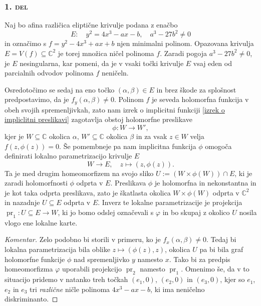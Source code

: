 \documentclass[mat1]{fmfdelo}
\numberwithin{equation}{section}
\newcommand{\C}{\mathbb C}
\DeclareMathOperator{\pr}{pr}
\theoremstyle{definition}
\newenvironment{komentar}[1][Komentar]{\begin{proof}[#1]\let\qed\relax}{\end{proof}}
\begin{document}
\subsubsection*{\textsc{1. del}}
Naj bo afina različica eliptične krivulje podana z enačbo
\[
    E: \quad y^2 = 4x^3 - ax - b, \quad a^3 - 27b^2 \neq 0
\]
in označimo s $f = y^2 - 4x^3 + ax + b$ njen minimalni polinom. Opazovana krivulja $E = V(f) \subseteq \C^2$ je torej množica ničel polinoma $f$. Zaradi pogoja $a^3 - 27b^2 \neq 0$, je $E$ nesingularna, kar pomeni, da je v vsaki točki krivulje $E$ vsaj eden od parcialnih odvodov polinoma $f$ neničeln. 

Osredotočimo se sedaj na eno točko $(\alpha, \beta) \in E$ in brez škode za splošnost predpostavimo, da je $f_y(\alpha, \beta) \neq 0$. Polinom $f$ je seveda holomorfna funkcija v obeh svojih spremenljivkah, zato nam izrek o implicitni funkciji \ref{izrek o impliclitni preslikavi} zagotavlja obstoj holomorfne preslikave 
\[
    \phi : W \to W',  
\]
kjer je $W \subseteq \C$ okolica $\alpha$, $W' \subseteq \C$ okolica $\beta$ in za vsak $z \in W$ velja $f(z, \phi(z)) = 0$. Še pomembneje pa nam implicitna funkcija $\phi$ omogoča definirati lokalno parametrizacijo krivulje $E$
\[
    W \to E, \quad z \mapsto (z, \phi(z)).
\] 
Ta je med drugim homeomorfizem na svojo sliko $U := (W \times \phi(W)) \cap E$, ki je zaradi holomorfnosti $\phi$ odprta v $E$. Preslikava $\phi$ je holomorfna in nekonstantna in je kot taka odprta preslikava, zato je škatlasta okolica $W \times \phi(W)$ odprta v $\C^2$ in nazadnje $U \subseteq E$ odprta v $E$. Inverz te lokalne parametrizacije je projekcija $\pr_1 : U \subseteq E \to W$, ki jo bomo odslej označevali s $\varphi$ in bo skupaj z okolico $U$ nosila vlogo ene lokalne karte. 




\begin{komentar}
    Zelo podobno bi storili v primeru, ko je $f_x(\alpha, \beta) \neq 0$. Tedaj bi lokalna parametrizacija bila oblike $z \mapsto (\phi(z), z)$, okolica $U$ pa bi bila graf holomorfne funkcije $\phi$ nad spremenljivko $y$ namesto $x$. Tako bi za predpis homeomorfizma $\varphi$ uporabili projekcijo $\pr_2$ namesto $\pr_1$. Omenimo še, da v to situacijo pridemo v natanko treh točkah $(e_1, 0)$, $(e_2, 0)$ in $(e_3, 0)$, kjer so $e_1$, $e_2$ in $e_3$ tri \emph{različne} ničle polinoma $4x^3 - ax - b$, ki ima neničelno diskriminanto.
\end{komentar}
\end{document}
